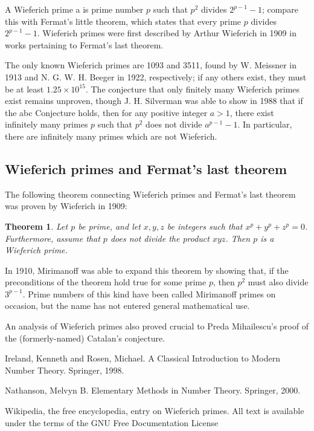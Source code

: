 \documentclass[12pt]{article}
\newcommand{\<}{\langle}
\renewcommand{\>}{\rangle}
\newtheorem{thm}{Theorem}
\begin{document}
A Wieferich prime a is prime number $p$ such that $p^2$ divides $2^{p-1}-1$; compare this with Fermat's little theorem, which states that every prime $p$ divides $2^{p-1}-1$. Wieferich primes were first described by Arthur Wieferich in 1909 in works pertaining to Fermat's last theorem.

The only known Wieferich primes are 1093 and 3511, found by W. Meissner in 1913 and N. G. W. H. Beeger in 1922, respectively; if any others exist, they must be at least $1.25\times 10^{15}$. The conjecture that only finitely many Wieferich primes exist remains unproven, though J. H. Silverman was able to show in 1988 that if the abc Conjecture holds, then for any positive integer $a>1$, there exist infinitely many primes $p$ such that $p^2$ does not divide $a^{p-1}-1$.  In particular, there are infinitely many primes which are not Wieferich.

\subsection*{Wieferich primes and Fermat's last theorem}

The following theorem connecting Wieferich primes and Fermat's last theorem was proven by Wieferich in 1909:

\begin{thm}
Let $p$ be prime, and let $x, y, z$ be integers such that $x^p+y^p+z^p=0$. Furthermore, assume that $p$ does not divide the product $xyz$. Then $p$ is a Wieferich prime.
\end{thm}

In 1910, Mirimanoff was able to expand this theorem by showing that, if the preconditions of the theorem hold true for some prime $p$, then $p^2$ must also divide $3^{p-1}$. Prime numbers of this kind have been called Mirimanoff primes on occasion, but the name has not entered general mathematical use.

An analysis of Wieferich primes also proved crucial to Preda Mihailescu's proof of the (formerly-named) Catalan's conjecture.

\begin{thebibliography}{9}
 Ireland, Kenneth and Rosen, Michael.  A Classical Introduction to Modern Number Theory.  Springer, 1998.

 Nathanson, Melvyn B.  Elementary Methods in Number Theory.  Springer, 2000.

 Wikipedia, the free encyclopedia, entry on Wieferich primes.  All text is available under the terms of the GNU Free Documentation License  
\end{thebibliography}
\end{document}
